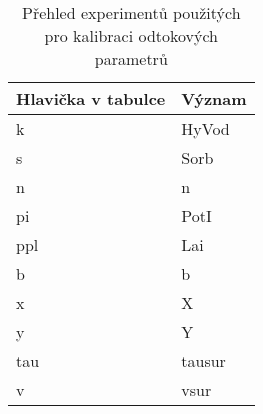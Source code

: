 \begin{table}%
  \centering
  \caption{Přehled experimentů použitých pro kalibraci odtokových parametrů}
  {\small
    \begin{tabular}{p{1.5cm}p{4cm}}
    \hline
    Hlavička v tabulce & Význam\\
    \hline \hline
    k  & \acl{HyVod} \\
    s  & \acl{Sorb} \\
    n & \acl{n}\\
    pi & \acl{PotI}\\
    ppl& \acl{Lai} \\
    b  & \acl{b} \\
    x  & \acl{X} \\
    y  & \acl{Y} \\
    tau  & \acl{tausur} \\
    v  & \acl{vsur} \\
    \hline
    \end{tabular}%
  }
  \label{tab:soilveg}%
\end{table}%